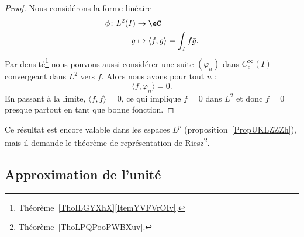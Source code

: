 \begin{proof}
    Nous considérons la forme linéaire
    \begin{equation}
        \begin{aligned}
            \phi\colon L^2(I)&\to \eC \\
            g&\mapsto \langle f, g\rangle=\int_If\bar g .
        \end{aligned}
    \end{equation}
    Par densité\footnote{Théorème~\ref{ThoILGYXhX}\ref{ItemYVFVrOIv}.} nous pouvons aussi considérer une suite \( (\varphi_n)\) dans \(  C^{\infty}_c(I)\) convergeant dans \( L^2\) vers \( f\). Alors nous avons pour tout \( n\) :
    \begin{equation}
        \langle f, \varphi_n\rangle =0.
    \end{equation}
    En passant à la limite, \( \langle f, f\rangle =0\), ce qui implique \( f=0\) dans \( L^2\) et donc \( f=0\) presque partout en tant que bonne fonction.
\end{proof}
Ce résultat est encore valable dans les espaces \( L^p\) (proposition~\ref{PropUKLZZZh}), mais il demande le théorème de représentation de Riesz\footnote{Théorème~\ref{ThoLPQPooPWBXuv}.}.

\subsection{Approximation de l'unité}



